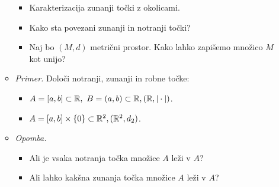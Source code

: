 \begin{enumerate}
\begin{itemize}
\begin{itemize}
            \item Karakterizacija zunanji točki z okolicami. 
    
            \item Kako sta povezani zunanji in notranji točki?
    
            \item Naj bo $(M, d)$ metrični prostor. Kako lahko zapišemo množico $M$ kot unijo?
        \end{itemize}
        \item \colorbox{yellow!30}{\emph{Primer.}} Določi notranji, zunanji in robne točke:
        \begin{itemize}
            \item $A = [a,b]\subset \mathbb{R}, \ B = (a,b) \subset \mathbb{R}, (\mathbb{R}, |\cdot|)$.
            \item $A = [a,b] \times \left\{0\right\} \subset \mathbb{R}^2, (\mathbb{R}^2, d_2)$.
        \end{itemize}
        \item \colorbox{yellow!30}{\emph{Opomba.}} 
        \begin{itemize}
            \item Ali je vsaka notranja točka množice $A$ leži v $A$?
            
            \item Ali lahko kakšna zunanja točka množice $A$ leži v $A$?
    

\end{itemize}
\end{itemize}
\end{enumerate}

